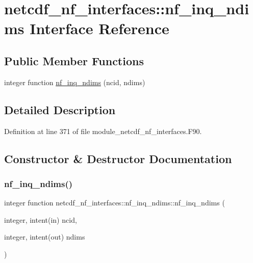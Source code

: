 \hypertarget{interfacenetcdf__nf__interfaces_1_1nf__inq__ndims}{}\section{netcdf\+\_\+nf\+\_\+interfaces\+:\+:nf\+\_\+inq\+\_\+ndims Interface Reference}
\label{interfacenetcdf__nf__interfaces_1_1nf__inq__ndims}
\subsection*{Public Member Functions}
\begin{DoxyCompactItemize}
\item 
integer function \hyperlink{interfacenetcdf__nf__interfaces_1_1nf__inq__ndims_a2aaba460f90a44b63490dfad38daed71}{nf\+\_\+inq\+\_\+ndims} (ncid, ndims)
\end{DoxyCompactItemize}


\subsection{Detailed Description}


Definition at line 371 of file module\+\_\+netcdf\+\_\+nf\+\_\+interfaces.\+F90.



\subsection{Constructor \& Destructor Documentation}
\mbox{\label{interfacenetcdf__nf__interfaces_1_1nf__inq__ndims_a2aaba460f90a44b63490dfad38daed71}} 
\subsubsection{\texorpdfstring{nf\+\_\+inq\+\_\+ndims()}{nf\_inq\_ndims()}}
{\footnotesize\ttfamily integer function netcdf\+\_\+nf\+\_\+interfaces\+::nf\+\_\+inq\+\_\+ndims\+::nf\+\_\+inq\+\_\+ndims (\begin{DoxyParamCaption}\item[{integer, intent(in)}]{ncid,  }\item[{integer, intent(out)}]{ndims }\end{DoxyParamCaption})}



